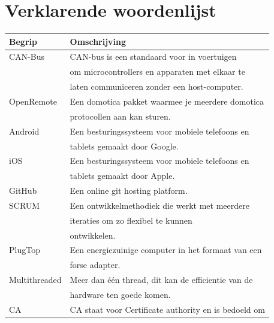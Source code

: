 \documentclass[]{article}
\begin{document}
\newpage
\section{Verklarende woordenlijst}

\begin{longtable}{|| l | l ||}\hline
    Begrip           & Omschrijving                                         \\\hline\hline
    CAN-Bus          & CAN-bus is een standaard voor in voertuigen          \\
                     & om microcontrollers en apparaten met elkaar te       \\
                     & laten communiceren zonder een host-computer.        \\\hline
    OpenRemote       & Een domotica pakket waarmee je meerdere domotica     \\
                     & protocollen aan kan sturen.                          \\\hline
    Android          & Een besturingssysteem voor mobiele telefoons en      \\
                     & tablets gemaakt door Google.                         \\\hline
    iOS              & Een besturingssysteem voor mobiele telefoons en      \\
                     & tablets gemaakt door Apple.                          \\\hline
    GitHub           & Een online git hosting platform.                     \\\hline
    SCRUM            & Een ontwikkelmethodiek die werkt met meerdere        \\
                     & iteraties om zo flexibel te kunnen                   \\
                     & ontwikkelen.                                         \\\hline
    PlugTop          & Een energiezuinige computer in het formaat van een   \\
                     & forse adapter.                                       \\\hline
    Multithreaded    & Meer dan \'e\'en thread, dit kan de efficientie van de   \\
                     & hardware ten goede komen.                            \\\hline
    CA               & CA staat voor Certificate authority en is bedoeld om \\

\end{longtable}
\end{document}
